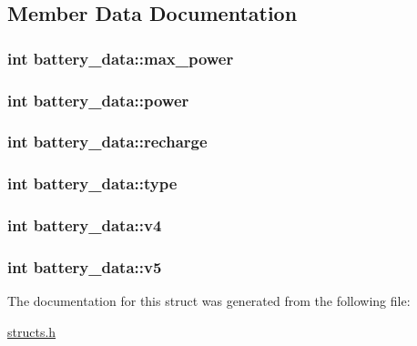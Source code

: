 \subsection{Member Data Documentation}
\hypertarget{structbattery__data_ad7b2bab9e7affed36c413eaa3279af39}{
\subsubsection[{max\-\_\-power}]{\setlength{\rightskip}{0pt plus 5cm}int battery\-\_\-data\-::max\-\_\-power}}\label{structbattery__data_ad7b2bab9e7affed36c413eaa3279af39}
\hypertarget{structbattery__data_aeb2fd557f78d85839b850d7ffd9f3c46}{
\subsubsection[{power}]{\setlength{\rightskip}{0pt plus 5cm}int battery\-\_\-data\-::power}}\label{structbattery__data_aeb2fd557f78d85839b850d7ffd9f3c46}
\hypertarget{structbattery__data_a3daf050843a0b85ac7c60f4ba699d983}{
\subsubsection[{recharge}]{\setlength{\rightskip}{0pt plus 5cm}int battery\-\_\-data\-::recharge}}\label{structbattery__data_a3daf050843a0b85ac7c60f4ba699d983}
\hypertarget{structbattery__data_a519024cb41f6c619235bf7bf439a8918}{
\subsubsection[{type}]{\setlength{\rightskip}{0pt plus 5cm}int battery\-\_\-data\-::type}}\label{structbattery__data_a519024cb41f6c619235bf7bf439a8918}
\hypertarget{structbattery__data_a848dcb38b4ee080b33794822887f789c}{
\subsubsection[{v4}]{\setlength{\rightskip}{0pt plus 5cm}int battery\-\_\-data\-::v4}}\label{structbattery__data_a848dcb38b4ee080b33794822887f789c}
\hypertarget{structbattery__data_a9e9ab46e28e3fcab7b29ed51210b3675}{
\subsubsection[{v5}]{\setlength{\rightskip}{0pt plus 5cm}int battery\-\_\-data\-::v5}}\label{structbattery__data_a9e9ab46e28e3fcab7b29ed51210b3675}


The documentation for this struct was generated from the following file\-:\begin{DoxyCompactItemize}
\item 
\hyperlink{structs_8h}{structs.\-h}\end{DoxyCompactItemize}
